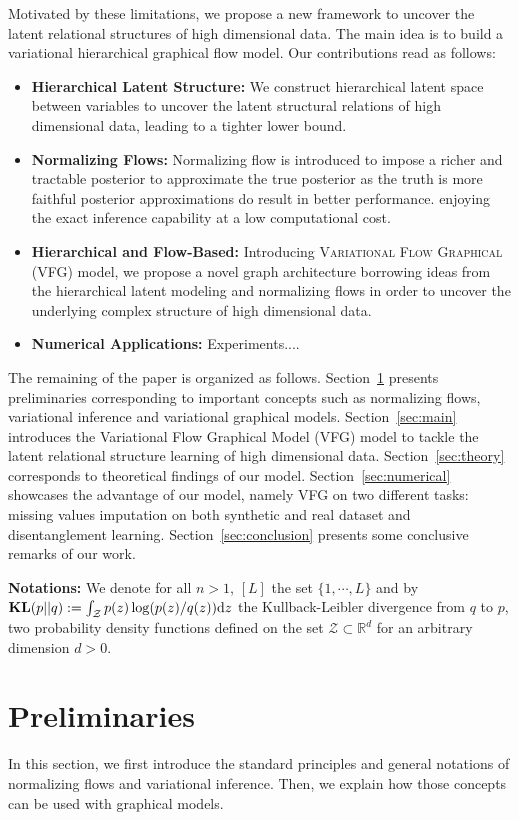 \documentclass{article} %
\begin{document}
Motivated by these limitations, we propose a new framework to uncover the latent relational structures of high dimensional data.
The main idea is to build a variational hierarchical graphical flow model. 
Our contributions read as follows:
\begin{itemize}
    \item \textbf{Hierarchical Latent Structure:} We construct hierarchical latent space between variables to uncover the latent structural relations of high dimensional data, leading to a tighter lower bound.
    \item \textbf{Normalizing Flows:} Normalizing flow is introduced to impose a richer and tractable posterior to approximate the true posterior as the truth is more faithful posterior approximations do result in better performance.  enjoying the exact inference capability at a low computational cost.
    \item \textbf{Hierarchical and Flow-Based:} Introducing \textsc{Variational Flow Graphical (VFG)} model, we propose a novel graph architecture borrowing ideas from the hierarchical latent modeling and normalizing flows in order to uncover the underlying complex structure of high dimensional data.
    \item \textbf{Numerical Applications:} Experiments....
\end{itemize}


The remaining of the paper is organized as follows.
Section~\ref{sec:prelim} presents preliminaries corresponding to important concepts such as normalizing flows, variational inference and variational graphical models.
Section~\ref{sec:main} introduces the Variational Flow Graphical Model (VFG) model to tackle the latent relational structure learning of high dimensional data.
Section~\ref{sec:theory} corresponds to theoretical findings of our model.
Section~\ref{sec:numerical} showcases the advantage of our model, namely VFG on two different tasks: missing values imputation on both synthetic and real dataset and disentanglement learning.
Section~\ref{sec:conclusion} presents some conclusive remarks of our work.

\textbf{Notations:} We denote for all $n >1$, $[L]$ the set $ \{1, \cdots, L\}$ and by $\textbf{\text{KL}}(p || q ) := \int_{\mathcal{Z}} p(z) \log(p(z)/q(z)) \mathrm{d}z$ the Kullback-Leibler divergence from $q$ to $p$, two probability density functions defined on the set $\mathcal{Z} \subset \mathbb{R}^d$ for an arbitrary dimension $d >0$.

\section{Preliminaries}\label{sec:prelim}
In this section, we first introduce the standard principles and general notations of normalizing flows and variational inference. 
Then, we explain how those concepts can be used with graphical models.
\end{document}
